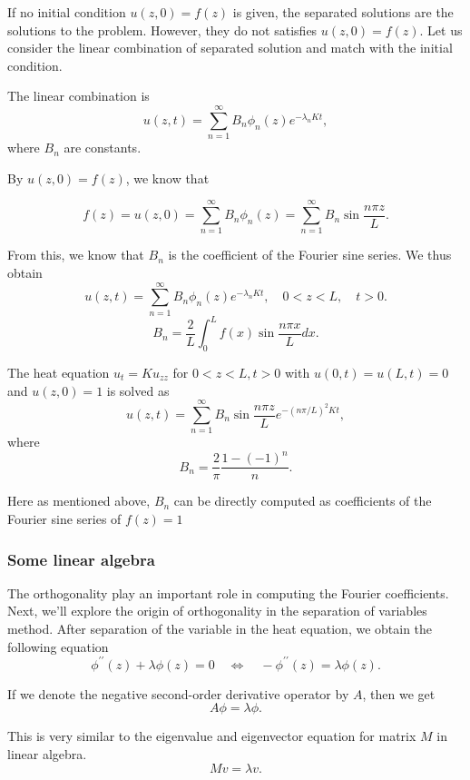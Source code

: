 If no initial condition $u(z, 0) = f(z)$ is given, the separated solutions are the solutions to the problem. However, they do not satisfies $u(z, 0) = f(z)$.
Let us consider the linear combination of separated solution and match with the initial condition.

The linear combination is 
$$
u(z, t)=\sum_{n=1}^{\infty} B_n \phi_n(z) e^{-\lambda_n K t},
$$
where $B_n$ are constants. 

By $u(z, 0) = f(z)$, we know that 

$$
f(z) = u(z, 0) = \sum_{n=1}^{\infty} B_n \phi_n(z) = \sum_{n=1}^{\infty} B_n \sin \frac{n\pi z}{L}.
$$

From this, we know that $B_n$ is the coefficient of the Fourier sine series. We thus obtain
$$
u(z, t)=\sum_{n=1}^{\infty} B_n \phi_n(z) e^{-\lambda_n K t}, \quad 0<z<L, \quad t>0 .
$$
$$
B_n=\frac{2}{L} \int_0^L f(x) \sin \frac{n \pi x}{L} d x.
$$

\begin{example}[]
The heat equation $u_t=K u_{z z}$ for $0<z<L, t>0$ with $u(0, t)=u(L, t)=0$ and $u(z, 0)=1$ is solved as
$$
u(z, t)=\sum_{n=1}^{\infty} B_n \sin \frac{n \pi z}{L} e^{-(n \pi / L)^2 K t},
$$
where  
$$
B_n=\frac{2}{\pi} \frac{1-(-1)^n}{n} .
$$

Here as mentioned above, $B_n$ can be directly computed as coefficients of the Fourier sine series of $f(z) = 1$
\end{example}

\subsubsection{Some linear algebra}

The orthogonality play an important role in computing the Fourier coefficients. Next, we'll explore the origin of orthogonality in the separation of variables method. After separation of the variable in the heat equation, we obtain the following equation
$$
\phi^{\prime \prime}(z)+\lambda \phi(z)=0 \quad \Leftrightarrow \quad -\phi^{\prime \prime}(z) = \lambda \phi(z).
$$

If we denote the negative second-order derivative operator by $A$, then we get
$$
A\phi = \lambda\phi.
$$ 

This is very similar to the eigenvalue and eigenvector equation for matrix $M$ in linear algebra.
\begin{equation}\label{eq.eigenvalue_linear_alg}
    M v = \lambda v.
\end{equation}

